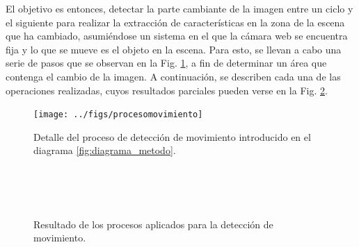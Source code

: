 El objetivo es entonces, detectar la parte cambiante de la imagen entre un ciclo y el siguiente para realizar la extracción de características en la zona de la escena que ha cambiado, asumiéndose un sistema en el que la cámara web se encuentra fija y lo que se mueve es el objeto en la escena. Para esto, se llevan a cabo una serie de pasos que se observan en la Fig. \ref{fig:diagrama_procesomovimiento}, a fin de determinar un área que contenga el cambio de la imagen. A continuación, se describen cada una de las operaciones realizadas, cuyos resultados parciales pueden verse en la Fig. \ref{fig:deteccion_movimiento}.
\begin{figure}[tbhp]
   \centering
        \texttt{[image: ../figs/procesomovimiento]}
    \caption[Detalle del proceso de detección de movimiento]{Detalle del proceso de detección de movimiento introducido en el diagrama \ref{fig:diagrama_metodo}.}
   \label{fig:diagrama_procesomovimiento}                %
\end{figure}
\begin{figure}[tbhp]
\centering
{}
\\
\\
\\
\caption[Detección de movimiento]{Resultado de los procesos aplicados para la detección de movimiento.}
\label{fig:deteccion_movimiento}               %
\end{figure}
